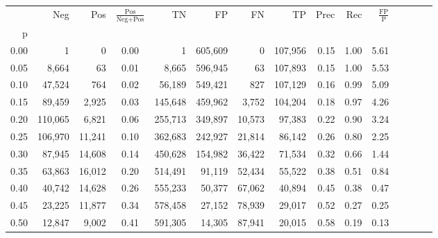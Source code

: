 \begin{tabular}{rrrcrrrrrrrrrrr}
\toprule
{} &      Neg &     Pos & $\frac{\text{Pos}}{\text{Neg}+\text{Pos}}$ &       TN &       FP &       FN &       TP &  Prec &   Rec & $\frac{\text{FP}}{\text{P}}$ \\
p    &          &         &                                            &          &          &          &          &       &       &                              \\
\midrule
0.00 &        1 &       0 &                                       0.00 &        1 &  605,609 &        0 &  107,956 &  0.15 &  1.00 &                         5.61 \\
0.05 &    8,664 &      63 &                                       0.01 &    8,665 &  596,945 &       63 &  107,893 &  0.15 &  1.00 &                         5.53 \\
0.10 &   47,524 &     764 &                                       0.02 &   56,189 &  549,421 &      827 &  107,129 &  0.16 &  0.99 &                         5.09 \\
0.15 &   89,459 &   2,925 &                                       0.03 &  145,648 &  459,962 &    3,752 &  104,204 &  0.18 &  0.97 &                         4.26 \\
0.20 &  110,065 &   6,821 &                                       0.06 &  255,713 &  349,897 &   10,573 &   97,383 &  0.22 &  0.90 &                         3.24 \\
0.25 &  106,970 &  11,241 &                                       0.10 &  362,683 &  242,927 &   21,814 &   86,142 &  0.26 &  0.80 &                         2.25 \\
0.30 &   87,945 &  14,608 &                                       0.14 &  450,628 &  154,982 &   36,422 &   71,534 &  0.32 &  0.66 &                         1.44 \\
0.35 &   63,863 &  16,012 &                                       0.20 &  514,491 &   91,119 &   52,434 &   55,522 &  0.38 &  0.51 &                         0.84 \\
0.40 &   40,742 &  14,628 &                                       0.26 &  555,233 &   50,377 &   67,062 &   40,894 &  0.45 &  0.38 &                         0.47 \\
0.45 &   23,225 &  11,877 &                                       0.34 &  578,458 &   27,152 &   78,939 &   29,017 &  0.52 &  0.27 &                         0.25 \\
0.50 &   12,847 &   9,002 &                                       0.41 &  591,305 &   14,305 &   87,941 &   20,015 &  0.58 &  0.19 &                         0.13 \\

\end{tabular}
